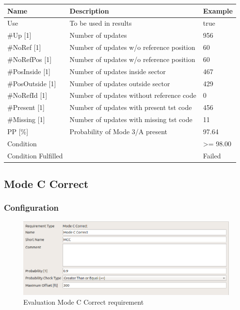 \begin{center}
 \begin{table}[H]
  \begin{tabularx}{\textwidth}{ | l | X |  l | }
    \hline
    \textbf{Name} & \textbf{Description} & \textbf{Example} \\ \hline
    Use & To be used in results & true \\ \hline
    \#Up [1] & Number of updates & 956 \\ \hline
    \#NoRef [1] & Number of updates w/o reference position & 60 \\ \hline
    \#NoRefPos [1] & Number of updates w/o reference position  & 60 \\ \hline
    \#PosInside [1] & Number of updates inside sector & 467 \\ \hline
    \#PosOutside [1] & Number of updates outside sector & 429 \\ \hline
    \#NoRefId [1] & Number of updates without reference code & 0 \\ \hline
    \#Present [1] & Number of updates with present tst code & 456 \\ \hline
    \#Missing [1] & Number of updates with missing tst code & 11 \\ \hline
    PP [\%] & Probability of Mode 3/A present & 97.64 \\ \hline
    Condition &  & >= 98.00 \\ \hline
    Condition Fulfilled &  & Failed \\ \hline
\end{tabularx}
\end{table}
\end{center}

\subsection{Mode C Correct}
\label{sec:eval_req_mc_correct} 

\subsubsection{Configuration}

\begin{figure}[H]
    \includegraphics[width=14cm,frame]{figures/eval_req_mc_correct.png}
  \caption{Evaluation Mode C Correct requirement}
\end{figure}

